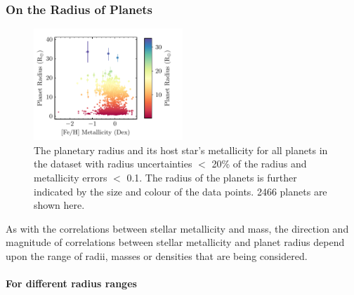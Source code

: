 \documentclass[a4paper,twocolumn,12pt]{article}
\begin{document}





\subsubsection{On the Radius of Planets}

\begin{figure}[h!]
    \centering
    \includegraphics[width=0.5\textwidth]{Graphs/FeH vs Radius Planet Plot.pdf}
    \caption{The planetary radius and its host star's metallicity for all planets in the dataset with radius uncertainties $<$ 20\% of the radius and metallicity errors $<$ 0.1. The radius of the planets is further indicated by the size and colour of the data points. 2466 planets are shown here.}
    \label{figure: Fe/H vs radius parameter plot}
\end{figure}

As with the correlations between stellar metallicity and mass, the direction and magnitude of correlations between stellar metallicity and planet radius depend upon the range of radii, masses or densities that are being considered.




\paragraph{For different radius ranges}
\end{document}
